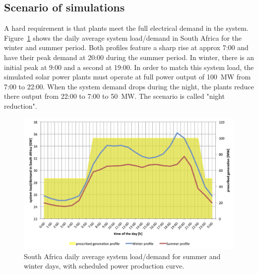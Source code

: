 \subsection{Scenario of simulations} \label{Overall simulated configuration}
A hard requirement is that plants meet the full electrical demand in the system. Figure~\ref{LoadScenarios} shows the daily average system load/demand in South Africa for the winter and summer period.
Both profiles feature a sharp rise at approx 7:00 and have their peak demand at 20:00 during the summer period.
In winter, there is an initial peak at 9:00 and a second at 19:00.
In order to match this system load, the simulated solar power plants must operate at full power output of 100~MW from 7:00 to 22:00. When the system demand drops during the night, the plants reduce there output from 22:00 to 7:00 to 50~MW. The scenario is called "night reduction".
\begin{figure}[htbp]  
\centering
\includegraphics[width=1\linewidth]{FIG/LoadScenarios}
\caption[South Africa daily average system load/demand for summer and winter days, with scheduled power production curve.]{South Africa daily average system load/demand for summer and winter days, with scheduled power production curve.}\label{LoadScenarios}
\end{figure}
